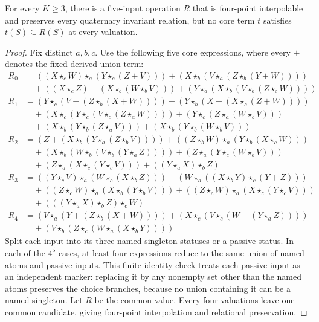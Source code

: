 \begin{theorem}\label{core:thm:four-local-minorant}
For every $K\geq3$, there is a five-input operation $R$ that is
four-point interpolable and preserves every quaternary invariant relation,
but no core term $t$ satisfies $t(S)\subseteq R(S)$ at every valuation.
\end{theorem}
\begin{proof}
Fix distinct $a,b,c$. Use the following five core expressions, where every
$+$ denotes the fixed derived union term:
{\small
\[
\begin{aligned}
 R_0&=((X\star_cW)\star_a(Y\star_c(Z+V)))+(X\star_b(V\star_a(Z\star_b(Y+W))))\\
 &\quad+((X\star_cZ)+(X\star_b(W\star_bV)))+(Y\star_a(X\star_b(V\star_b(Z\star_cW))))\\
 R_1&=(Y\star_c(V+(Z\star_b(X+W))))+(Y\star_b(X+(X\star_c(Z+W))))\\
 &\quad+(X\star_c(Y\star_c(V\star_c(Z\star_aW))))+(Y\star_c(Z\star_a(W\star_bV)))\\
 &\quad+(X\star_b(Y\star_b(Z\star_aV)))+(X\star_b(Y\star_b(W\star_bV)))\\
 R_2&=(Z+(X\star_b(Y\star_a(Z\star_bV))))+((Z\star_bW)\star_a(Y\star_b(X\star_cW)))\\
 &\quad+(X\star_b(W\star_b(V\star_b(Y\star_aZ))))+(Z\star_a(Y\star_c(W\star_bV)))\\
 &\quad+(Z\star_a(X\star_c(Y\star_cV)))+((Y\star_aX)\star_bZ)\\
 R_3&=((Y\star_cV)\star_a(W\star_c(X\star_bZ)))+(W\star_a((X\star_bY)\star_c(Y+Z)))\\
 &\quad+((Z\star_cW)\star_a(X\star_b(Y\star_bV)))+((Z\star_cW)\star_a(X\star_c(Y\star_cV)))\\
 &\quad+(((Y\star_aX)\star_bZ)\star_cW)\\
 R_4&=(V\star_a(Y+(Z\star_b(X+W))))+(X\star_c(V\star_c(W+(Y\star_aZ))))\\
 &\quad+(V\star_b(Z\star_c(W\star_a(X\star_bY))))
\end{aligned}
\]}
Split each input into its three named singleton statuses or a passive
status. In each of the $4^5$ cases, at least four expressions reduce to
the same union of named atoms and passive inputs. This finite identity
check treats each passive input as an independent marker: replacing it by
any nonempty set other than the named atoms preserves the choice branches,
because no union containing it can be a named singleton. Let $R$ be the
common value. Every four valuations leave one common candidate, giving
four-point interpolation and relational preservation.


\end{proof}
